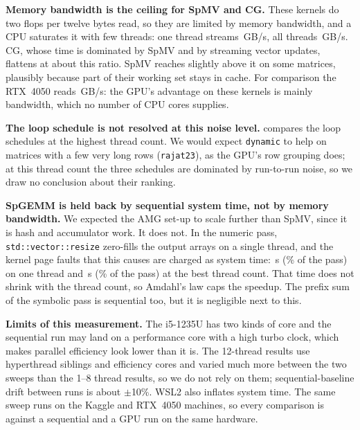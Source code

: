 \textbf{Memory bandwidth is the ceiling for SpMV and CG.} These kernels do two flops per twelve bytes read, so they
are limited by memory bandwidth, and a CPU saturates it with few threads: one thread streams \,GB/s,
all  threads \,GB/s. CG, whose time is
dominated by SpMV and by streaming vector updates, flattens at about this ratio. SpMV reaches slightly above it on some matrices, plausibly because part of their
working set stays in cache. For comparison the RTX~4050 reads \,GB/s: the GPU's advantage on these kernels
is mainly bandwidth, which no number of CPU cores supplies.

\textbf{The loop schedule is not resolved at this noise level.}  compares the loop schedules at the highest thread
count. We would expect \texttt{dynamic} to help on matrices with a few very long rows (\texttt{rajat23}), as the
GPU's row grouping does; at this thread count the three schedules are dominated by run-to-run noise, so we draw no
conclusion about their ranking.

\begin{table}[t]
\centering\small
\caption{SpMV CSR with each loop schedule at the highest thread count (geometric mean over six matrices).}\label{tab:omp-sched}
\end{table}

\textbf{SpGEMM is held back by sequential system time, not by memory bandwidth.} We expected the AMG set-up to scale
further than SpMV, since it is hash and accumulator work. It does not. In the numeric pass, \texttt{std::vector::resize}
zero-fills the output arrays on a single thread, and the kernel page faults that this causes are charged as system time:
\,s (\% of the pass) on one thread
and \,s (\% of the pass) at the best thread count. That time does not shrink with the thread count, so
Amdahl's law caps the speedup. The prefix sum of the symbolic pass is sequential too, but it is negligible next to this.

\textbf{Limits of this measurement.} The i5-1235U has two kinds of core and the sequential run may land on a
performance core with a high turbo clock, which makes parallel efficiency look lower than it is. The 12-thread
results use hyperthread siblings and efficiency cores and varied much more between the two sweeps than the
1--8 thread results, so we do not rely on them; sequential-baseline drift between runs is about $\pm$10\%.
WSL2 also inflates system time. The same sweep runs on the Kaggle and RTX~4050 machines, so every
comparison is against a sequential and a GPU run on the same hardware.

